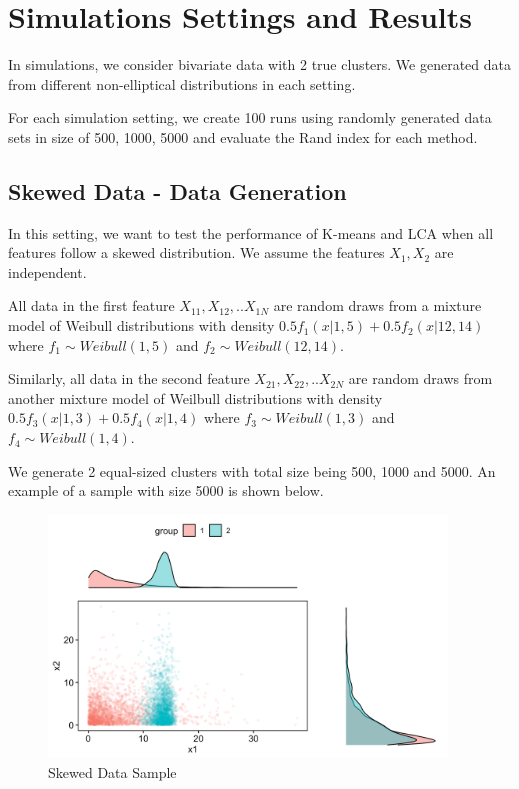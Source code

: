 \documentclass[
]{article}
\begin{document}
\hypertarget{simulations-settings-and-results}{%
\section{Simulations Settings and
Results}\label{simulations-settings-and-results}}

In simulations, we consider bivariate data with 2 true clusters. We
generated data from different non-elliptical distributions in each
setting.

For each simulation setting, we create 100 runs using randomly generated
data sets in size of 500, 1000, 5000 and evaluate the Rand index for
each method.

\hypertarget{skewed-data---data-generation}{%
\subsection{Skewed Data - Data
Generation}\label{skewed-data---data-generation}}

In this setting, we want to test the performance of K-means and LCA when
all features follow a skewed distribution. We assume the features
\(X_1, X_2\) are independent.

All data in the first feature \(X_{11}, X_{12},..X_{1N}\) are random
draws from a mixture model of Weibull distributions with density
\(0.5f_1(x|1,5) + 0.5f_2(x|12,14)\) where \(f_1 \sim Weibull(1,5)\) and
\(f_2 \sim Weibull (12,14)\).

Similarly, all data in the second feature \(X_{21}, X_{22},..X_{2N}\)
are random draws from another mixture model of Weilbull distributions
with density \(0.5f_3(x|1,3) + 0.5f_4(x|1,4)\) where
\(f_3 \sim Weibull(1,3)\) and \(f_4 \sim Weibull (1,4)\).

We generate 2 equal-sized clusters with total size being 500, 1000 and
5000. An example of a sample with size 5000 is shown below.

\begin{figure}
\centering
\includegraphics[width=4.16667in,height=\textheight]{report_image/skewed_sample.png}
\caption{Skewed Data Sample}
\end{figure}
\end{document}
